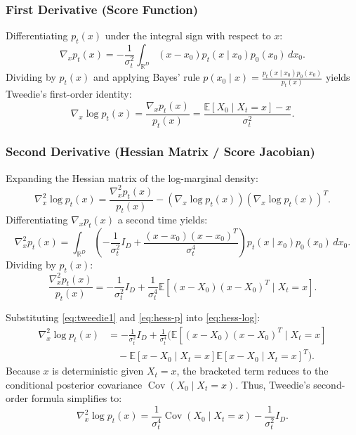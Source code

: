 \documentclass{article}
\theoremstyle{plain}
\theoremstyle{definition}
\theoremstyle{remark}
\begin{document}
\subsubsection{First Derivative (Score Function)}
Differentiating $p_t(x)$ under the integral sign with respect to $x$:
\begin{equation}
\nabla_x p_t(x) = -\frac{1}{\sigma_t^2} \int_{\mathbb{R}^D} (x - x_0) p_t(x \mid x_0) p_0(x_0) \, dx_0.
\end{equation}
Dividing by $p_t(x)$ and applying Bayes' rule $p(x_0 \mid x) = \frac{p_t(x \mid x_0) p_0(x_0)}{p_t(x)}$ yields Tweedie's first-order identity:
\begin{equation}
\nabla_x \log p_t(x) = \frac{\nabla_x p_t(x)}{p_t(x)} = \frac{\mathbb{E}[X_0 \mid X_t = x] - x}{\sigma_t^2}.
\label{eq:tweedie1}
\end{equation}

\subsubsection{Second Derivative (Hessian Matrix / Score Jacobian)}
Expanding the Hessian matrix of the log-marginal density:
\begin{equation}
\nabla_x^2 \log p_t(x) = \frac{\nabla_x^2 p_t(x)}{p_t(x)} - \left( \nabla_x \log p_t(x) \right) \left( \nabla_x \log p_t(x) \right)^T.
\label{eq:hess-log}
\end{equation}
Differentiating $\nabla_x p_t(x)$ a second time yields:
\begin{equation}
\nabla_x^2 p_t(x) = \int_{\mathbb{R}^D} \left( -\frac{1}{\sigma_t^2} I_D + \frac{(x - x_0)(x - x_0)^T}{\sigma_t^4} \right) p_t(x \mid x_0) p_0(x_0) \, dx_0.
\end{equation}
Dividing by $p_t(x)$:
\begin{equation}
\frac{\nabla_x^2 p_t(x)}{p_t(x)} = -\frac{1}{\sigma_t^2} I_D + \frac{1}{\sigma_t^4} \mathbb{E}\left[(x - X_0)(x - X_0)^T \mid X_t = x\right].
\label{eq:hess-p}
\end{equation}


Substituting \eqref{eq:tweedie1} and \eqref{eq:hess-p} into \eqref{eq:hess-log}:
\begin{align}
\nabla_x^2 \log p_t(x) &= -\frac{1}{\sigma_t^2} I_D + \frac{1}{\sigma_t^4} \Big( \mathbb{E}\left[(x - X_0)(x - X_0)^T \mid X_t = x\right] \nonumber \\
&\quad - \mathbb{E}\left[x - X_0 \mid X_t = x\right] \mathbb{E}\left[x - X_0 \mid X_t = x\right]^T \Big).
\end{align}
Because $x$ is deterministic given $X_t = x$, the bracketed term reduces to the conditional posterior covariance $\operatorname{Cov}(X_0 \mid X_t = x)$. Thus, Tweedie's second-order formula simplifies to:
\begin{equation}
\nabla_x^2 \log p_t(x) = \frac{1}{\sigma_t^4} \operatorname{Cov}(X_0 \mid X_t = x) - \frac{1}{\sigma_t^2} I_D.
\end{equation}
\end{document}
